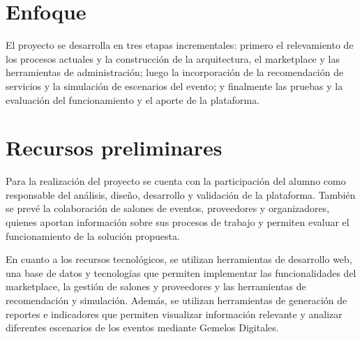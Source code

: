 \section{Enfoque}

El proyecto se desarrolla en tres etapas incrementales: primero el
relevamiento de los procesos actuales y la construcción de la
arquitectura, el marketplace y las herramientas de administración; luego
la incorporación de la recomendación de servicios y la simulación de
escenarios del evento; y finalmente las pruebas y la evaluación del
funcionamiento y el aporte de la plataforma.

\section{Recursos preliminares}

Para la realización del proyecto se cuenta con la participación del
alumno como responsable del análisis, diseño, desarrollo y validación de
la plataforma. También se prevé la colaboración de salones de eventos,
proveedores y organizadores, quienes aportan información sobre sus
procesos de trabajo y permiten evaluar el funcionamiento de la solución
propuesta.

En cuanto a los recursos tecnológicos, se utilizan herramientas de
desarrollo web, una base de datos y tecnologías que permiten implementar
las funcionalidades del marketplace, la gestión de salones y proveedores y
las herramientas de recomendación y simulación. Además, se
utilizan herramientas de generación de reportes e indicadores que
permiten visualizar información relevante y analizar diferentes
escenarios de los eventos mediante Gemelos Digitales.

